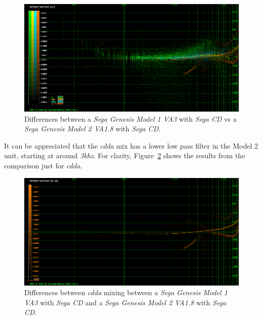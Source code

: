\documentclass[10pt,a4paper]{report}
\newcommand{\ac}[1]{\textit{\mbox{\acrshort{#1}}}}
\newcommand{\khz}[1]{\textit{\mbox{#1\acrshort{khz}}}}
\begin{document}
\begin{figure}[H]
	\centering
	\includegraphics[width=1.0\linewidth]{images/results/13-A-MD1UTVA3-SCD-LA_vs_A-MD2UCVA18-SCD.png}
	\caption[A-MD1UTVA3-SCD-LA vs A-MD2UCVA18-SCD]{Differences between a \textit{Sega Genesis Model 1 VA3} with \textit{Sega CD} vs a \textit{Sega Genesis Model 2 VA1.8} with \textit{Sega CD}.}
	\label{fig:A-MD1UTVA3-SCD-LA_vs_A-MD2UCVA18-SCD}
\end{figure}

It can be appreciated that the \ac{cdda} mix has a lower low pass filter in the Model 2 unit, starting at around \khz{3}. For clarity, Figure~\ref{fig:A-MD1UTVA3-SCD-LA_vs_A-MD2UCVA18-SCD-LA_04CD-DA} shows the results from the comparison just for \ac{cdda}.

\begin{figure}[H]
	\centering
	\includegraphics[width=1.0\linewidth]{images/results/14-A-MD1UTVA3-SCD-LA_vs_A-MD2UCVA18-SCD-LA_04CD-DA.png}
	\caption[A-MD1UTVA3-SCD-LA_vs_A-MD2UCVA18-SCD-LA_04CD-DA]{Differences between \ac{cdda} mixing between a \textit{Sega Genesis Model 1 VA3} with \textit{Sega CD} and a \textit{Sega Genesis Model 2 VA1.8} with \textit{Sega CD}.}
	\label{fig:A-MD1UTVA3-SCD-LA_vs_A-MD2UCVA18-SCD-LA_04CD-DA}
\end{figure}
\end{document}
